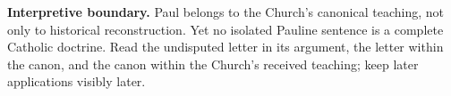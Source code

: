 \begin{studyframe}
\textbf{Interpretive boundary.} Paul belongs to the Church's canonical
teaching, not only to historical reconstruction. Yet no isolated Pauline
sentence is a complete Catholic doctrine. Read the undisputed letter in its
argument, the letter within the canon, and the canon within the Church's
received teaching; keep later applications visibly later.
\end{studyframe}
